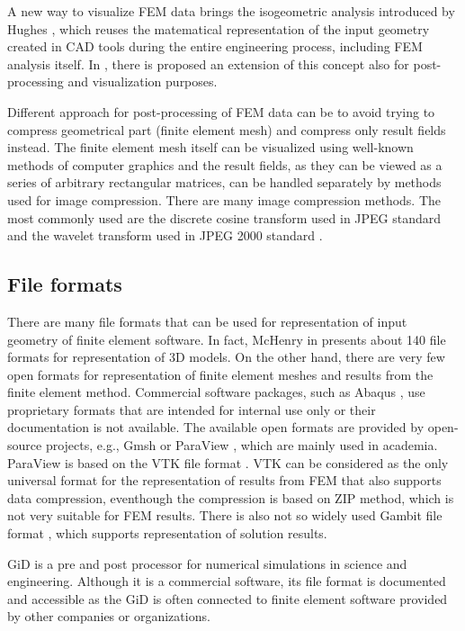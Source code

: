 A new way to visualize FEM data brings the isogeometric analysis introduced by Hughes \cite{Hughes2005}, which reuses the matematical representation of the input geometry created in CAD tools during the entire engineering process, including FEM analysis itself. In \cite{Stahl2017}, there is proposed an extension of this concept also for post-processing and visualization purposes.

Different approach for post-processing of FEM data can be to avoid trying to compress geometrical part (finite element mesh) and compress only result fields instead. The finite element mesh itself can be visualized using well-known methods of computer graphics and the result fields, as they can be viewed as a series of arbitrary rectangular matrices, can be handled separately by methods used for image compression. There are many image compression methods. The most commonly used are the discrete cosine transform \cite{Watson1994} used in JPEG standard and the wavelet transform used in JPEG 2000 standard \cite{Lui2001}.


\subsection{File formats}

There are many file formats that can be used for representation of input geometry of finite element software. In fact, McHenry in \cite{McHenry2008} presents about 140 file formats for representation of 3D models. On the other hand, there are very few open formats for representation of finite element meshes and results from the finite element method. Commercial software packages, such as Abaqus \cite{Abaqus}, use proprietary formats that are intended for internal use only or their documentation is not available. The available open formats are provided by open-source projects, e.g., Gmsh \cite{Geuzaine2009} or ParaView \cite{ParaView2005}, which are mainly used in academia. ParaView is based on the VTK file format \cite{VTK2015}. VTK can be considered as the only universal format for the representation of results from FEM that also supports data compression, eventhough the compression is based on ZIP method, which is not very suitable for FEM results. There is also not so widely used Gambit file format \cite{GAMBIT}, which supports representation of solution results.

GiD \cite{GiDWeb} is a pre and post processor for numerical simulations in science and engineering. Although it is a commercial software, its file format is documented \cite{GiDPostProcess} and accessible as the GiD is often connected to finite element software provided by other companies or organizations.


